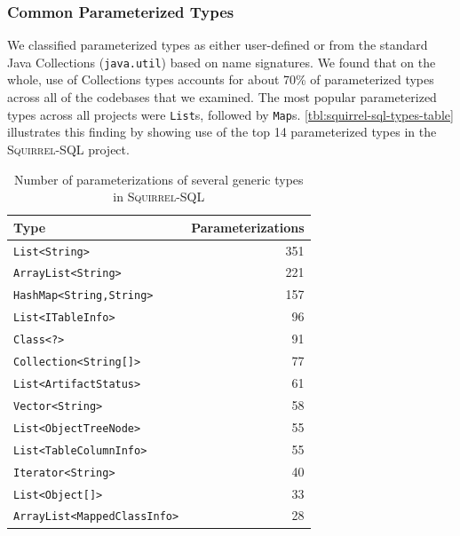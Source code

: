 \documentclass{svjour3}
\newcommand{\code}[1]{\texttt{#1}}
\newcommand{\squirrelsql}{\textsc{Squirrel-SQL}\xspace}
\begin{document}
\subsubsection{Common Parameterized Types}

We classified parameterized types as either user-defined
or from the standard Java Collections (\code{java.util}) based on name signatures.
We found that on the whole, use of Collections
types accounts for about 70\% of parameterized types across all of the codebases that we
examined.  %
The most popular parameterized types across all projects
were \code{List}s, followed by \code{Map}s. 
\autoref{tbl:squirrel-sql-types-table}
illustrates this finding by showing use of 
the top 14 parameterized types in the \squirrelsql project.

\begin{table}[htb]
\centering

\begin{tabular}{lr}
\toprule
\textbf{Type} & \textbf{Parameterizations} \\
\midrule 
\texttt{List<String>} & 351\\
\texttt{ArrayList<String>} & 221\\
\texttt{HashMap<String,String>} & 157\\
\texttt{List<ITableInfo>} & 96\\
\texttt{Class<?>} & 91\\
\texttt{Collection<String[]>} & 77\\
\texttt{List<ArtifactStatus>} & 61\\
\texttt{Vector<String>} & 58\\
\texttt{List<ObjectTreeNode>} & 55\\
\texttt{List<TableColumnInfo>} & 55\\
\texttt{Iterator<String>} & 40\\
\texttt{List<Object[]>} & 33\\
\texttt{ArrayList<MappedClassInfo>} & 28\\
\bottomrule
\end{tabular}
\caption{Number of parameterizations of several generic types in \squirrelsql}
\label{tbl:squirrel-sql-types-table}
\end{table}
\end{document}
